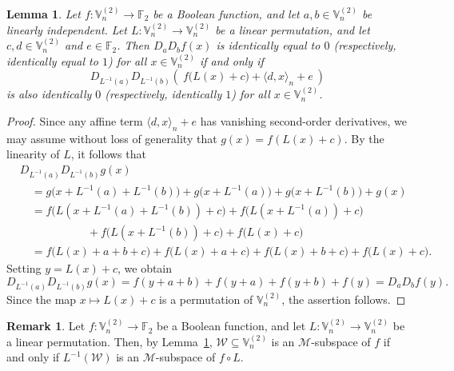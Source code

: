 \documentclass[12pt]{article}
\theoremstyle{plain}
\newtheorem{lemma}{Lemma}
\theoremstyle{definition}
\newtheorem{remark}{Remark}
\newcommand{\F}{\mathbb{F}}
\newcommand{\V}{\mathbb{V}}
\renewcommand{\to}{\rightarrow}
\begin{document}
	\begin{lemma}\label{lem:second}
		Let \(f \colon \V_n^{(2)} \to \F_2\) be a Boolean function, and let
		\(a,b \in \V_n^{(2)}\) be linearly independent. Let
		\(L \colon \V_n^{(2)} \to \V_n^{(2)}\) be a linear permutation, and let
		\(c,d \in \V_n^{(2)}\) and \(e \in \F_2\).
		Then \(D_a D_b f(x)\) is identically equal to \(0\) (respectively, identically equal to $1$)
		for all \(x \in \V_n^{(2)}\) if and only if
		\begin{equation}\label{eq:second}
			D_{L^{-1}(a)} D_{L^{-1}(b)} \left(\ f\bigl(L(x)+c\bigr)
			+ \langle d,x\rangle_n + e \ \right) 
		\end{equation}
		is also identically \(0\) (respectively, identically \(1\)) for all
		\(x \in \V_n^{(2)}\).
	\end{lemma}
	
	\begin{proof}
		Since any affine term \(\langle d,x\rangle_n + e\) has vanishing second-order
		derivatives, we may assume without loss of generality that
		\(g(x) = f(L(x)+c)\). By the linearity of \(L\), it follows that
		\begin{align*}
			& D_{L^{-1}(a)} D_{L^{-1}(b)} g(x) \\
			&\quad
			= g\bigl(x + L^{-1}(a) + L^{-1}(b)\bigr)
			+ g\bigl(x + L^{-1}(a)\bigr)
			+ g\bigl(x + L^{-1}(b)\bigr)
			+ g(x) \\
			& \quad
			= f\bigl(L(x + L^{-1}(a) + L^{-1}(b)) + c\bigr) + f\bigl(L(x + L^{-1}(a)) + c\bigr) \\
			&\qquad \qquad \qquad
			+ f\bigl(L(x + L^{-1}(b)) + c\bigr)
			+ f\bigl(L(x) + c\bigr) \\
			& \quad
			= f\bigl(L(x) + a + b + c\bigr)
			+ f\bigl(L(x) + a + c\bigr)
			+ f\bigl(L(x) + b + c\bigr)
			+ f\bigl(L(x) + c\bigr).
		\end{align*}
		Setting \(y = L(x) + c\), we obtain
		\[
		D_{L^{-1}(a)} D_{L^{-1}(b)} g(x)
		= f(y+a+b) + f(y+a) + f(y+b) + f(y)
		= D_a D_b f(y).
		\]
		Since the map \(x \mapsto L(x) + c\) is a permutation of \(\V_n^{(2)}\), the
		assertion follows.
	\end{proof}
	
	\begin{remark}\label{rem:fcircL}
		Let \(f \colon \V_n^{(2)} \to \F_2\) be a Boolean function, and let
		\(L \colon \V_n^{(2)} \to \V_n^{(2)}\) be a linear permutation. Then, by Lemma~\ref{lem:second},
		\(\mathcal{W} \subseteq \V_n^{(2)}\) is an \(\mathcal{M}\)-subspace of \(f\) if and only if
		\(L^{-1}(\mathcal{W})\) is an \(\mathcal{M}\)-subspace of \(f \circ L\).
	\end{remark}
	
\end{document}
